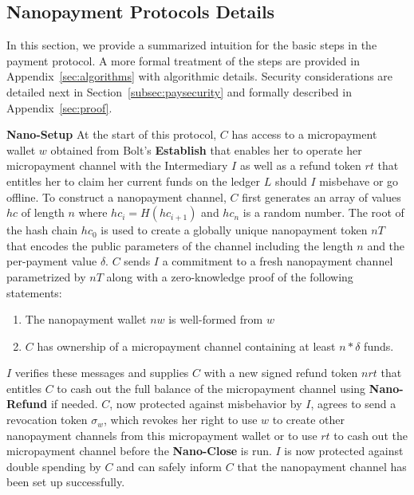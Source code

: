 \subsection{Nanopayment Protocols Details}
\label{sec:nanopaymentdetails}
In this section, we provide a summarized intuition for the basic steps in the
payment protocol. A more formal treatment of the steps are provided in
Appendix~\ref{sec:algorithms} with algorithmic details. Security considerations
are detailed next in Section~\ref{subsec:paysecurity} and formally described in
Appendix~\ref{sec:proof}.


\textbf{Nano-Setup} At the start of this protocol, $C$ has access to a
micropayment wallet $w$ obtained from Bolt's \textbf{Establish} that enables her
to operate her micropayment channel with the Intermediary $I$ as well as a
refund token $rt$ that entitles her to claim her current funds on the ledger $L$
should $I$ misbehave or go offline. To construct a nanopayment channel, $C$
first generates an array of values $hc$ of length $n$ where $hc_i = H(hc_{i+1})$
and $hc_n$ is a random number. The root of the hash chain $hc_0$ is used to
create a globally unique nanopayment token $nT$ that encodes the public
parameters of the channel including the length $n$ and the per-payment value
$\delta$. $C$ sends $I$ a commitment to a fresh nanopayment channel parametrized
by $nT$ along with a zero-knowledge proof of the following statements:

\begin{enumerate}
\item The nanopayment wallet $nw$ is well-formed from $w$
\item $C$ has ownership of a micropayment channel containing at least $n *
  \delta$ funds.
\end{enumerate}

$I$ verifies these messages and supplies $C$ with a new signed refund token
$nrt$ that entitles $C$ to cash out the full balance of the micropayment channel
using \textbf{Nano-Refund} if needed.
$C$, now protected against misbehavior by $I$, agrees to send a revocation token
$\sigma_w$, which revokes her right to use $w$ to create other nanopayment
channels from this micropayment wallet or to use $rt$ to cash out the
micropayment channel before the \textbf{Nano-Close} is run. $I$ is now protected
against double spending by $C$ and can safely inform $C$ that the nanopayment
channel has been set up successfully.

